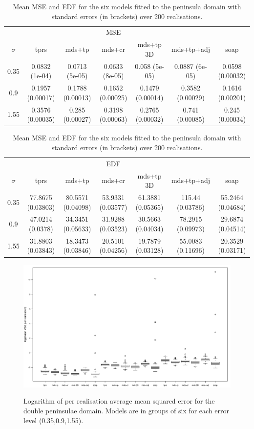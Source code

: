 \begin{table}
\centering
\begin{tabular}{c c c c c c c}
 & &  & MSE  & & &\\ 
$\sigma$  & tprs & mds+tp & mds+cr & mds+tp 3D & mds+tp+adj & soap\\ 
\hline
0.35  & 0.0832 (1e-04) & 0.0713 (5e-05) & 0.0633 (8e-05) & 0.058 (5e-05) & 0.0887 (6e-05) & 0.0598 (0.00032)\\ 
0.9  & 0.1957 (0.00017) & 0.1788 (0.00013) & 0.1652 (0.00025) & 0.1479 (0.00014) & 0.3582 (0.00029) & 0.1616 (0.00201)\\ 
1.55  & 0.3576 (0.00035) & 0.285 (0.00027) & 0.3198 (0.00063) & 0.2765 (0.00032) & 0.741 (0.00085) & 0.245 (0.00034)\\ 
\end{tabular}
\begin{tabular}{c c c c c c c}
 & &  & EDF  & & &\\ 
$\sigma$  & tprs & mds+tp & mds+cr & mds+tp 3D & mds+tp+adj & soap\\ 
\hline
0.35  & 77.8675 (0.03803) & 80.5571 (0.04098) & 53.9331 (0.03577) & 61.3881 (0.05365) & 115.44 (0.03786) & 55.2464 (0.04684)\\ 
0.9  & 47.0214 (0.0378) & 34.3451 (0.05633) & 31.9288 (0.03523) & 30.5663 (0.04034) & 78.2915 (0.09973) & 29.6874 (0.04514)\\ 
1.55  & 31.8803 (0.03843) & 18.3473 (0.03846) & 20.5101 (0.04256) & 19.7879 (0.03128) & 55.0083 (0.11696) & 20.3529 (0.03171)\\ 
\end{tabular}
\caption{Mean MSE and EDF for the six models fitted to the peninsula domain with standard errors (in brackets) over 200 realisations.}
\label{bigwt2resultstable}
\end{table}







\begin{figure}
\centering
\includegraphics[width=9.5in]{mds/figs/big-mds-wt2-boxplot.pdf} \\
\caption{Logarithm of per realisation average mean squared error for the double peninsulae domain. Models are in groups of six for each error level (0.35,0.9,1.55).}
\label{big-wt2-mses}
\end{figure}


